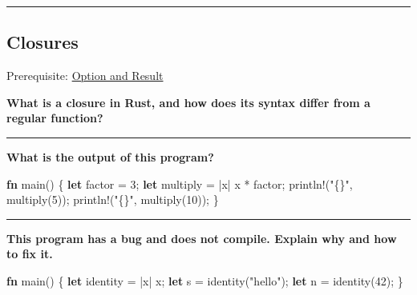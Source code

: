 \documentclass[
  11pt,
]{article}
\newenvironment{Shaded}{}{}
\newcommand{\DecValTok}[1]{\textcolor[rgb]{0.25,0.63,0.44}{#1}}
\newcommand{\KeywordTok}[1]{\textcolor[rgb]{0.00,0.44,0.13}{\textbf{#1}}}
\newcommand{\NormalTok}[1]{#1}
\newcommand{\OperatorTok}[1]{\textcolor[rgb]{0.40,0.40,0.40}{#1}}
\newcommand{\PreprocessorTok}[1]{\textcolor[rgb]{0.74,0.48,0.00}{#1}}
\newcommand{\StringTok}[1]{\textcolor[rgb]{0.25,0.44,0.63}{#1}}
\begin{document}
\begin{Shaded}
\begin{Highlighting}[]

\end{Highlighting}
\end{Shaded}

\begin{center}\rule{0.5\linewidth}{0.5pt}\end{center}

\subsection{Closures}\label{closures}

Prerequisite: \hyperref[option-and-result]{Option and Result}

\textbf{What is a closure in Rust, and how does its syntax differ from a
regular function?}

\begin{center}\rule{0.5\linewidth}{0.5pt}\end{center}

\textbf{What is the output of this program?}

\begin{Shaded}
\begin{Highlighting}[]
\KeywordTok{fn}\NormalTok{ main() }\OperatorTok{\{}
    \KeywordTok{let}\NormalTok{ factor }\OperatorTok{=} \DecValTok{3}\OperatorTok{;}
    \KeywordTok{let}\NormalTok{ multiply }\OperatorTok{=} \OperatorTok{|}\NormalTok{x}\OperatorTok{|}\NormalTok{ x }\OperatorTok{*}\NormalTok{ factor}\OperatorTok{;}
    \PreprocessorTok{println!}\NormalTok{(}\StringTok{"\{\}"}\OperatorTok{,}\NormalTok{ multiply(}\DecValTok{5}\NormalTok{))}\OperatorTok{;}
    \PreprocessorTok{println!}\NormalTok{(}\StringTok{"\{\}"}\OperatorTok{,}\NormalTok{ multiply(}\DecValTok{10}\NormalTok{))}\OperatorTok{;}
\OperatorTok{\}}
\end{Highlighting}
\end{Shaded}

\begin{center}\rule{0.5\linewidth}{0.5pt}\end{center}

\textbf{This program has a bug and does not compile. Explain why and how
to fix it.}

\begin{Shaded}
\begin{Highlighting}[]
\KeywordTok{fn}\NormalTok{ main() }\OperatorTok{\{}
    \KeywordTok{let}\NormalTok{ identity }\OperatorTok{=} \OperatorTok{|}\NormalTok{x}\OperatorTok{|}\NormalTok{ x}\OperatorTok{;}
    \KeywordTok{let}\NormalTok{ s }\OperatorTok{=}\NormalTok{ identity(}\StringTok{"hello"}\NormalTok{)}\OperatorTok{;}
    \KeywordTok{let}\NormalTok{ n }\OperatorTok{=}\NormalTok{ identity(}\DecValTok{42}\NormalTok{)}\OperatorTok{;}
\OperatorTok{\}}
\end{Highlighting}
\end{Shaded}
\end{document}
